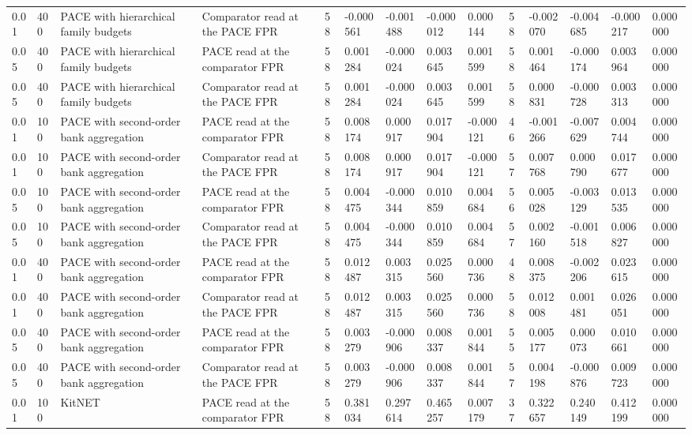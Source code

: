 \begin{tabular}{llllllllllllll}
0.01 & 400 & PACE with hierarchical family budgets & Comparator read at the PACE FPR & 58 & -0.000561 & -0.001488 & -0.000012 & 0.000144 & 58 & -0.002070 & -0.004685 & -0.000217 & 0.000000 \\
0.05 & 400 & PACE with hierarchical family budgets & PACE read at the comparator FPR & 58 & 0.001284 & -0.000024 & 0.003645 & 0.001599 & 58 & 0.001464 & -0.000174 & 0.003964 & 0.000000 \\
0.05 & 400 & PACE with hierarchical family budgets & Comparator read at the PACE FPR & 58 & 0.001284 & -0.000024 & 0.003645 & 0.001599 & 58 & 0.000831 & -0.000728 & 0.003313 & 0.000000 \\
0.01 & 100 & PACE with second-order bank aggregation & PACE read at the comparator FPR & 58 & 0.008174 & 0.000917 & 0.017904 & -0.000121 & 46 & -0.001266 & -0.007629 & 0.004744 & 0.000000 \\
0.01 & 100 & PACE with second-order bank aggregation & Comparator read at the PACE FPR & 58 & 0.008174 & 0.000917 & 0.017904 & -0.000121 & 57 & 0.007768 & 0.000790 & 0.017677 & 0.000000 \\
0.05 & 100 & PACE with second-order bank aggregation & PACE read at the comparator FPR & 58 & 0.004475 & -0.000344 & 0.010859 & 0.004684 & 56 & 0.005028 & -0.003129 & 0.013535 & 0.000000 \\
0.05 & 100 & PACE with second-order bank aggregation & Comparator read at the PACE FPR & 58 & 0.004475 & -0.000344 & 0.010859 & 0.004684 & 57 & 0.002160 & -0.001518 & 0.006827 & 0.000000 \\
0.01 & 400 & PACE with second-order bank aggregation & PACE read at the comparator FPR & 58 & 0.012487 & 0.003315 & 0.025560 & 0.000736 & 48 & 0.008375 & -0.002206 & 0.023615 & 0.000000 \\
0.01 & 400 & PACE with second-order bank aggregation & Comparator read at the PACE FPR & 58 & 0.012487 & 0.003315 & 0.025560 & 0.000736 & 58 & 0.012008 & 0.001481 & 0.026051 & 0.000000 \\
0.05 & 400 & PACE with second-order bank aggregation & PACE read at the comparator FPR & 58 & 0.003279 & -0.000906 & 0.008337 & 0.001844 & 55 & 0.005177 & 0.000073 & 0.010661 & 0.000000 \\
0.05 & 400 & PACE with second-order bank aggregation & Comparator read at the PACE FPR & 58 & 0.003279 & -0.000906 & 0.008337 & 0.001844 & 57 & 0.004198 & -0.000876 & 0.009723 & 0.000000 \\
0.01 & 100 & KitNET & PACE read at the comparator FPR & 58 & 0.381034 & 0.297614 & 0.465257 & 0.007179 & 37 & 0.322657 & 0.240149 & 0.412199 & 0.000000 \\

\end{tabular}
